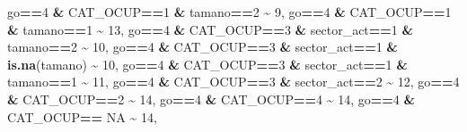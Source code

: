 \documentclass[
]{article}
\newenvironment{Shaded}{\begin{snugshade}}{\end{snugshade}}
\newcommand{\ConstantTok}[1]{\textcolor[rgb]{0.56,0.35,0.01}{#1}}
\newcommand{\DecValTok}[1]{\textcolor[rgb]{0.00,0.00,0.81}{#1}}
\newcommand{\FunctionTok}[1]{\textcolor[rgb]{0.13,0.29,0.53}{\textbf{#1}}}
\newcommand{\NormalTok}[1]{#1}
\newcommand{\SpecialCharTok}[1]{\textcolor[rgb]{0.81,0.36,0.00}{\textbf{#1}}}
\begin{document}
\begin{Shaded}
\begin{Highlighting}[]
\NormalTok{                               go}\SpecialCharTok{==}\DecValTok{4} \SpecialCharTok{\&}\NormalTok{ CAT\_OCUP}\SpecialCharTok{==}\DecValTok{1} \SpecialCharTok{\&}\NormalTok{ tamano}\SpecialCharTok{==}\DecValTok{2}  \SpecialCharTok{\textasciitilde{}} \DecValTok{9}\NormalTok{,    }
\NormalTok{                               go}\SpecialCharTok{==}\DecValTok{4} \SpecialCharTok{\&}\NormalTok{ CAT\_OCUP}\SpecialCharTok{==}\DecValTok{1} \SpecialCharTok{\&}\NormalTok{ tamano}\SpecialCharTok{==}\DecValTok{1}  \SpecialCharTok{\textasciitilde{}} \DecValTok{13}\NormalTok{,   }
\NormalTok{                               go}\SpecialCharTok{==}\DecValTok{4} \SpecialCharTok{\&}\NormalTok{ CAT\_OCUP}\SpecialCharTok{==}\DecValTok{3} \SpecialCharTok{\&}\NormalTok{ sector\_act}\SpecialCharTok{==}\DecValTok{1} \SpecialCharTok{\&}\NormalTok{ tamano}\SpecialCharTok{==}\DecValTok{2}  \SpecialCharTok{\textasciitilde{}} \DecValTok{10}\NormalTok{,   }
\NormalTok{                               go}\SpecialCharTok{==}\DecValTok{4} \SpecialCharTok{\&}\NormalTok{ CAT\_OCUP}\SpecialCharTok{==}\DecValTok{3} \SpecialCharTok{\&}\NormalTok{ sector\_act}\SpecialCharTok{==}\DecValTok{1} \SpecialCharTok{\&} \FunctionTok{is.na}\NormalTok{(tamano)  }\SpecialCharTok{\textasciitilde{}} \DecValTok{10}\NormalTok{,   }
\NormalTok{                               go}\SpecialCharTok{==}\DecValTok{4} \SpecialCharTok{\&}\NormalTok{ CAT\_OCUP}\SpecialCharTok{==}\DecValTok{3} \SpecialCharTok{\&}\NormalTok{ sector\_act}\SpecialCharTok{==}\DecValTok{1} \SpecialCharTok{\&}\NormalTok{ tamano}\SpecialCharTok{==}\DecValTok{1}  \SpecialCharTok{\textasciitilde{}} \DecValTok{11}\NormalTok{,   }
\NormalTok{                               go}\SpecialCharTok{==}\DecValTok{4} \SpecialCharTok{\&}\NormalTok{ CAT\_OCUP}\SpecialCharTok{==}\DecValTok{3} \SpecialCharTok{\&}\NormalTok{ sector\_act}\SpecialCharTok{==}\DecValTok{2} \SpecialCharTok{\textasciitilde{}} \DecValTok{12}\NormalTok{,}
\NormalTok{                               go}\SpecialCharTok{==}\DecValTok{4} \SpecialCharTok{\&}\NormalTok{ CAT\_OCUP}\SpecialCharTok{==}\DecValTok{2}  \SpecialCharTok{\textasciitilde{}} \DecValTok{14}\NormalTok{,   }
\NormalTok{                               go}\SpecialCharTok{==}\DecValTok{4} \SpecialCharTok{\&}\NormalTok{ CAT\_OCUP}\SpecialCharTok{==}\DecValTok{4}  \SpecialCharTok{\textasciitilde{}} \DecValTok{14}\NormalTok{,   }
\NormalTok{                               go}\SpecialCharTok{==}\DecValTok{4} \SpecialCharTok{\&}\NormalTok{ CAT\_OCUP}\SpecialCharTok{==} \ConstantTok{NA} \SpecialCharTok{\textasciitilde{}} \DecValTok{14}\NormalTok{,}
         

\end{Highlighting}
\end{Shaded}
\end{document}
